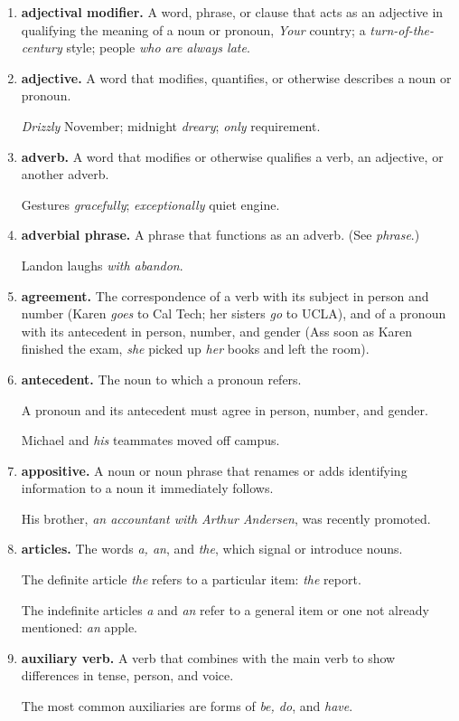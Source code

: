 \documentclass{article}
\begin{document}
\begin{enumerate}
	\item {\bf adjectival modifier.} A word, phrase, or clause that acts as an adjective in qualifying the meaning of a noun or pronoun, {\it Your} country; a {\it turn-of-the-century} style; people {\it who are always late}.
	\item {\bf adjective.} A word that modifies, quantifies, or otherwise describes a noun or pronoun.
	
	{\it Drizzly} November; midnight {\it dreary}; {\it only} requirement.
	\item {\bf adverb.} A word that modifies or otherwise qualifies a verb, an adjective, or another adverb.
	
	Gestures {\it gracefully}; {\it exceptionally} quiet engine.
	\item {\bf adverbial phrase.} A phrase that functions as an adverb. (See {\it phrase}.)
	
	Landon laughs {\it with abandon}.
	\item {\bf agreement.} The correspondence of a verb with its subject in person and number (Karen {\it goes} to Cal Tech; her sisters {\it go} to UCLA), and of a pronoun with its antecedent in person, number, and gender (Ass soon as Karen finished the exam, {\it she} picked up {\it her} books and left the room).
	\item {\bf antecedent.} The noun to which a pronoun refers.
	
	A pronoun and its antecedent must agree in person, number, and gender.
	
	Michael and {\it his} teammates moved off campus.
	\item {\bf appositive.} A noun or noun phrase that renames or adds identifying information to a noun it immediately follows.
	
	His brother, {\it an accountant with Arthur Andersen}, was recently promoted.
	\item {\bf articles.} The words {\it a, an}, and {\it the}, which signal or introduce nouns.
	
	The definite article {\it the} refers to a particular item: {\it the} report.
	
	The indefinite articles {\it a} and {\it an} refer to a general item or one not already mentioned: {\it an} apple.
	\item {\bf auxiliary verb.} A verb that combines with the main verb to show differences in tense, person, and voice.
	
	The most common auxiliaries are forms of {\it be, do}, and {\it have}.
	

\end{enumerate}
\end{document}
